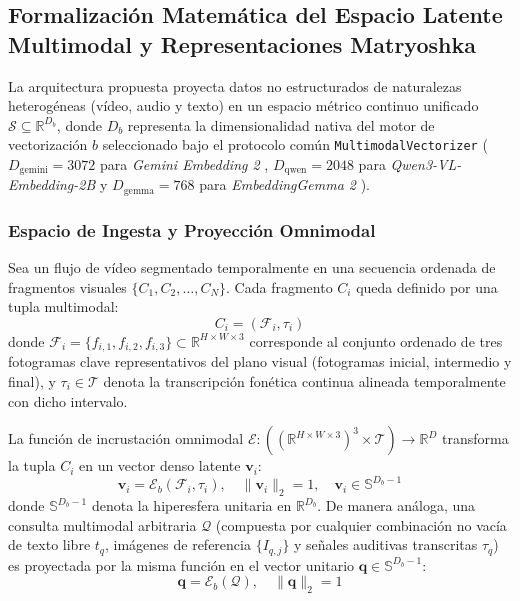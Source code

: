 \subsection{Formalización Matemática del Espacio Latente Multimodal y Representaciones Matryoshka}
\label{subsec:formulacion_matematica_mrl}

La arquitectura propuesta proyecta datos no estructurados de naturalezas heterogéneas (vídeo, audio y texto) en un espacio métrico continuo unificado $\mathcal{S} \subseteq \mathbb{R}^{D_b}$, donde $D_b$ representa la dimensionalidad nativa del motor de vectorización $b$ seleccionado bajo el protocolo común \texttt{MultimodalVectorizer} ($D_{\text{gemini}} = 3072$ para \textit{Gemini Embedding 2} \cite{gemini_emb2_docs}, $D_{\text{qwen}} = 2048$ para \textit{Qwen3-VL-Embedding-2B} \cite{qwen3_vl_emb2026, hf_qwen3_2b} y $D_{\text{gemma}} = 768$ para \textit{EmbeddingGemma 2} \cite{hf_embeddinggemma2}).

\subsubsection{Espacio de Ingesta y Proyección Omnimodal}
Sea un flujo de vídeo segmentado temporalmente en una secuencia ordenada de fragmentos visuales $\{C_1, C_2, \dots, C_N\}$. Cada fragmento $C_i$ queda definido por una tupla multimodal:
\begin{equation}
    C_i = \left( \mathcal{F}_i, \tau_i \right)
\end{equation}
donde $\mathcal{F}_i = \{f_{i,1}, f_{i,2}, f_{i,3}\} \subset \mathbb{R}^{H \times W \times 3}$ corresponde al conjunto ordenado de tres fotogramas clave representativos del plano visual (fotogramas inicial, intermedio y final), y $\tau_i \in \mathcal{T}$ denota la transcripción fonética continua alineada temporalmente con dicho intervalo.

La función de incrustación omnimodal $\mathcal{E}: \left( (\mathbb{R}^{H \times W \times 3})^3 \times \mathcal{T} \right) \to \mathbb{R}^D$ transforma la tupla $C_i$ en un vector denso latente $\mathbf{v}_i$:
\begin{equation}
    \mathbf{v}_i = \mathcal{E}_b(\mathcal{F}_i, \tau_i), \quad \|\mathbf{v}_i\|_2 = 1, \quad \mathbf{v}_i \in \mathbb{S}^{D_b-1}
\end{equation}
donde $\mathbb{S}^{D_b-1}$ denota la hiperesfera unitaria en $\mathbb{R}^{D_b}$. De manera análoga, una consulta multimodal arbitraria $\mathcal{Q}$ (compuesta por cualquier combinación no vacía de texto libre $t_q$, imágenes de referencia $\{I_{q,j}\}$ y señales auditivas transcritas $\tau_q$) es proyectada por la misma función en el vector unitario $\mathbf{q} \in \mathbb{S}^{D_b-1}$:
\begin{equation}
    \mathbf{q} = \mathcal{E}_b(\mathcal{Q}), \quad \|\mathbf{q}\|_2 = 1
\end{equation}


